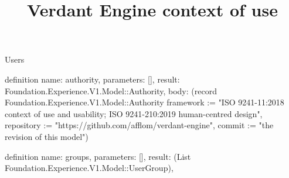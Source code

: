 \begin{lexlean}{Users}
\title{Verdant Engine context of use}
\begin{semanticmodule}
definition{
  name: authority,
  parameters: [],
  result: Foundation.Experience.V1.Model::Authority,
  body: (record Foundation.Experience.V1.Model::Authority {framework := "ISO 9241-11:2018 context of use and usability; ISO 9241-210:2019 human-centred design", repository := "https://github.com/afflom/verdant-engine", commit := "the revision of this model"})
}

definition{
  name: groups,
  parameters: [],
  result: (List Foundation.Experience.V1.Model::UserGroup),
}
\end{semanticmodule}
\end{lexlean}
